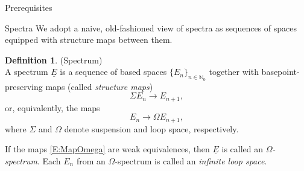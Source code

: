 \documentclass[12pt]{amsart}
\newcommand{\Map}{\operatorname{Map}}
\theoremstyle{plain}
\newtheorem{thm}{Theorem}[section]
\theoremstyle{definition}
\newtheorem{defin}[thm]{Definition}
\newtheorem{example}[thm]{Example}
\theoremstyle{remark}
\begin{document}
\begin{section}{Prerequisites}
\begin{subsection}{Spectra}
We adopt a naive, old-fashioned view of spectra as sequences of spaces equipped with structure maps between them.
\begin{defin}(Spectrum)\\
A spectrum $\underline{E}$ is a sequence of based spaces $\{E_n\}_{n\in \mathbb{N}_0}$ together with basepoint-preserving maps (called \textit{structure maps})
\begin{equation}\label{E:SigmaMap}
\Sigma E_n \rightarrow E_{n+1},
\end{equation}
or, equivalently, the maps
\begin{equation}\label{E:MapOmega}
E_n \rightarrow \Omega E_{n+1},
\end{equation}
where $\Sigma$ and $\Omega$ denote suspension and loop space, respectively.

If the maps \eqref{E:MapOmega} are weak equivalences, then $\underline{E}$ is called an \textit{$\Omega$-spectrum}. Each $E_n$ from an $\Omega$-spectrum is called an \textit{infinite loop space}.
\end{defin}


\end{subsection}
\end{section}
\end{document}
